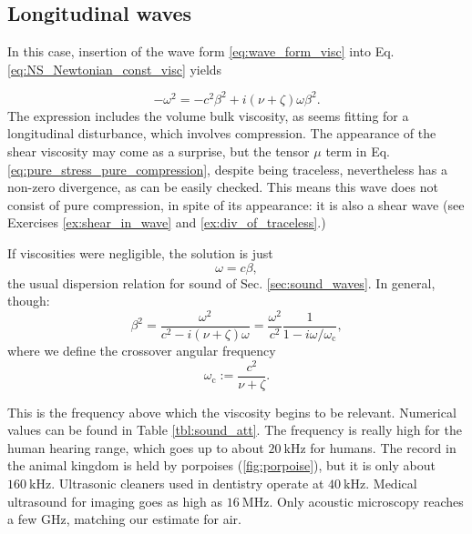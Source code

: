\subsection{Longitudinal waves}

In this case, insertion of the wave form \ref{eq:wave_form_visc} into
Eq. \ref{eq:NS_Newtonian_const_visc} yields

\begin{equation}
  -\omega^2 = - c^2\beta^2 + i (\nu+\zeta)  \omega \beta^2 .
\end{equation}
The expression includes the volume bulk viscosity, as seems fitting
for a longitudinal disturbance, which involves compression.  The
appearance of the shear viscosity may come as a surprise, but the
tensor $\mu$ term in Eq. \ref{eq:pure_stress_pure_compression},
despite being traceless, nevertheless has a non-zero divergence, as
can be easily checked.  This means this wave does not consist of pure
compression, in spite of its appearance: it is also a shear wave (see
Exercises \ref{ex:shear_in_wave} and \ref{ex:div_of_traceless}.)


If viscosities were negligible, the solution is just
\[
\omega =  c \beta ,
\]
%
the usual dispersion relation for sound of
Sec. \ref{sec:sound_waves}. In general, though:
\begin{equation}
  \label{eq:waves_att_dispersion}
  \beta^2 =
  \frac{\omega^2}{c^2 - i(\nu+\zeta)\omega}=
  \frac{\omega^2}{c^2}\frac{1}{1 -  i\omega/\omega_\mathrm{c}},
\end{equation}
where we define the crossover angular frequency 
\[
  \omega_\mathrm{c} := \frac{c^2}{\nu + \zeta }.
\]

This is the frequency above which the viscosity begins to be relevant.
Numerical values can be found in Table \ref{tbl:sound_att}. The
frequency is really high for the human hearing range, which goes up to
about $\SI{20}{\kilo\hertz}$ for humans. The record in the animal
kingdom is held by porpoises (\ref{fig:porpoise}), but it is only
about $\SI{160}{\kilo\hertz}$. Ultrasonic cleaners used in dentistry
operate at $\SI{40}{\kilo\hertz}$. Medical ultrasound for imaging goes
as high as $\SI{16}{\mega\hertz}$. Only acoustic microscopy
\cite{kp:AM} reaches a few \si{\giga\hertz}, matching our estimate for
air.


